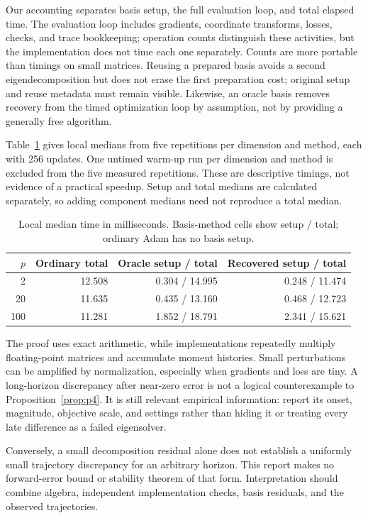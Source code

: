 \documentclass[11pt,a4paper]{article}
\begin{document}
Our accounting separates basis setup, the full evaluation loop, and total
elapsed time. The evaluation loop includes gradients, coordinate transforms,
losses, checks, and trace bookkeeping; operation counts distinguish these
activities, but the implementation does not time each one separately.
Counts are more portable than timings on small matrices.
Reusing a prepared basis avoids a second eigendecomposition but
does not erase the first preparation cost; original setup and reuse metadata
must remain visible. Likewise, an oracle basis removes recovery from the timed
optimization loop by assumption, not by providing a generally free algorithm.

Table~\ref{tab:timings} gives local medians from five repetitions per dimension
and method, each with 256 updates. One untimed warm-up run per dimension and
method is excluded from the five measured repetitions. These are descriptive
timings, not evidence of a practical speedup. Setup and total medians are calculated
separately, so adding component medians need not reproduce a total median.

\begin{table}[htbp]
 \centering
 \caption{Local median time in milliseconds. Basis-method cells show
 setup / total; ordinary Adam has no basis setup.}
 \label{tab:timings}
 \begin{tabular}{rrrr}
 \toprule
 $p$ & Ordinary total & Oracle setup / total & Recovered setup / total \\
 \midrule
 2 & 12.508 & 0.304 / 14.995 & 0.248 / 11.474 \\
 20 & 11.635 & 0.435 / 13.160 & 0.468 / 12.723 \\
 100 & 11.281 & 1.852 / 18.791 & 2.341 / 15.621 \\
 \bottomrule
 \end{tabular}
\end{table}

The proof uses exact arithmetic, while implementations repeatedly multiply
floating-point matrices and accumulate moment histories. Small perturbations
can be amplified by normalization, especially when gradients and loss are
tiny. A long-horizon discrepancy after near-zero error is not a logical
counterexample to Proposition~\ref{prop:p4}. It is still relevant empirical
information: report its onset, magnitude, objective scale, and settings rather
than hiding it or treating every late difference as a failed eigensolver.

Conversely, a small decomposition residual alone does not establish a uniformly
small trajectory discrepancy for an arbitrary horizon. This report makes no
forward-error bound or stability theorem of that form. Interpretation should
combine algebra, independent implementation checks, basis residuals, and the
observed trajectories.
\end{document}
